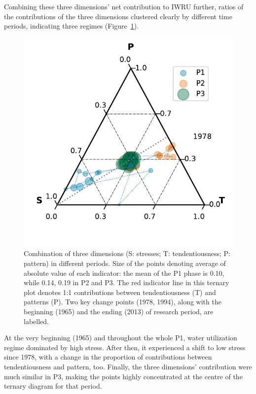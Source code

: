 \documentclass[9pt, twocolumn, twoside, lineno]{pnas-new}
\begin{document}
Combining these three dimensions' net contribution to IWRU further, ratios of the contributions of the three dimensions clustered clearly by different time periods, indicating three regimes (Figure~\ref{fig:phases}).
\begin{figure}%
	\centering
	\includegraphics[width=\linewidth]{../../figures/main/phases.pdf}
	\caption{Combination of three dimensions (S: stresses; T: tendentiousness; P: pattern) in different periods. 
	Size of the points denoting average of absolute value of each indicator: the mean of the P1 phase is 0.10, while 0.14, 0.19 in P2 and P3.
	The red indicator line in this ternary plot denotes 1:1 contributions between tendentiousness (T) and patterns (P).
	Two key change points (1978, 1994), along with the beginning (1965) and the ending (2013) of research period, are labelled.}
	\label{fig:phases}
\end{figure}
At the very beginning (1965) and throughout the whole P1, water utilization regime dominated by high stress. After then, it experienced a shift to low stress since 1978, with a change in the proportion of contributions between tendentiousness and pattern, too.
Finally, the three dimensions' contribution were much similar in P3, making the points highly concentrated at the centre of the ternary diagram for that period.
\end{document}
